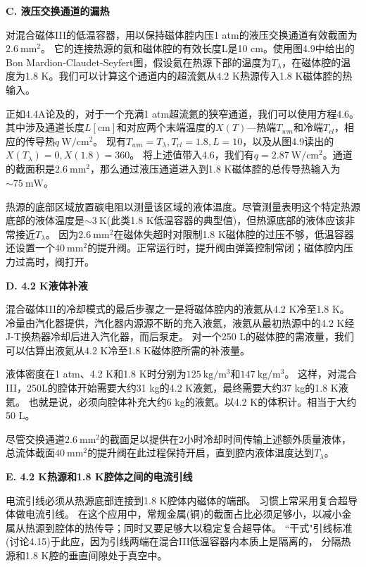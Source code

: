 \textbf{C. 液压交换通道的漏热}

对混合磁体III的低温容器，用以保持磁体腔内压1 atm的液压交换通道有效截面为$2.6\ \mathrm{mm^2}$。
它的连接热源的氦和磁体腔的有效长度L是10 cm。使用图4.9中给出的Bon
Mardion-Claudet-Seyfert图，假设氦在热源下部的温度为$T_\lambda$，在磁体腔的温度为1.8 K。我们可以计算这个通道内的超流氦从4.2 K热源传入1.8 K磁体腔的热输入。

正如4.4A论及的，对于一个充满1 atm超流氦的狭窄通道，我们可以使用方程4.6。其中涉及通道长度$L[\mathrm{cm}]$和对应两个末端温度的$X(T)$---热端$T_{wm}$和冷端$T_{cl}$，相应的传导热$q\ \mathrm{W/cm^2}$。
现有$T_{wm}=T_\lambda, T_{cl}=1.8,L=10$，以及从图4.9读出的$X(T_\lambda)=0,X(1.8)=360$。
将上述值带入4.6，我们有$q=2.87\ \mathrm{W/cm^2}$。通道的截面积是$2.6\ \mathrm{mm^2}$，那么通过液压通道进入到1.8 K磁体腔的总传导热输入为$\sim 75\ \mathrm{mW}$。

热源的底部区域放置碳电阻以测量该区域的液体温度。尽管测量表明这个特定热源底部的液体温度是$\sim 3\ \mathrm{K}$(此类1.8 K低温容器的典型值)，但热源底部的液体应该非常接近$T_\lambda$。
因为$2.6\ \mathrm{mm^2}$在磁体失超时对限制1.8 K磁体腔的过压不够，低温容器还设置一个$40\ \mathrm{mm^2}$的提升阀。正常运行时，提升阀由弹簧控制常闭；磁体腔内压力过高时，阀打开。

\textbf{D. 4.2 K液体补液}

混合磁体III的冷却模式的最后步骤之一是将磁体腔内的液氦从4.2 K冷至1.8 K。
冷量由汽化器提供，汽化器内源源不断的充入液氦，液氦从最初热源中的4.2 K经J-T换热器冷却后进入汽化器，而后泵走。
对一个250 L的磁体腔的需液量，我们可以估算出液氦从4.2 K冷至1.8 K磁体腔所需的补液量。

液体密度在1 atm、4.2 K和1.8 K时分别为$125\ \mathrm{kg/m^3}$和$147\ \mathrm{kg/m^3}$。
这样，对混合III，250L的腔体开始需要大约31 kg的4.2 K液氦，最终需要大约37 kg的1.8 K液氦。
也就是说，必须向腔体补充大约6 kg的液氦。以4.2 K的体积计。相当于大约50 L。 

尽管交换通道$2.6\ \mathrm{mm^2}$的截面足以提供在2小时冷却时间传输上述额外质量液体，
总流体截面$40\ \mathrm{mm^2}$的提升阀在此过程保持开启，直到腔内液体温度达到$T_\lambda$。

\textbf{E. 4.2 K热源和1.8 K腔体之间的电流引线}

电流引线必须从热源底部连接到1.8 K腔体内磁体的端部。
习惯上常采用复合超导体做电流引线。
在这个应用中，常规金属(铜)的截面占比必须足够小，以减小金属从热源到腔体的热传导；同时又要足够大以稳定复合超导体。
``干式"引线标准(讨论4.15)于此应，因为引线两端在混合III低温容器内本质上是隔离的，
分隔热源和1.8 K腔的垂直间隙处于真空中。

